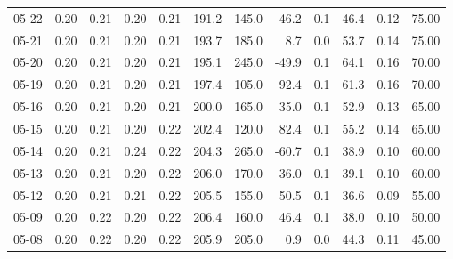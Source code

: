 \begin{threeparttable}
{\begin{tabular}{lrrrrrrrrrrr}
  05-22 &          0.20 &          0.21 &          0.20 &        0.21 &               191.2 &               145.0 &       46.2 &                 0.1 &             46.4 &            0.12 &                  75.00 \\
  05-21 &          0.20 &          0.21 &          0.20 &        0.21 &               193.7 &               185.0 &        8.7 &                 0.0 &             53.7 &            0.14 &                  75.00 \\
  05-20 &          0.20 &          0.21 &          0.20 &        0.21 &               195.1 &               245.0 &      -49.9 &                 0.1 &             64.1 &            0.16 &                  70.00 \\
  05-19 &          0.20 &          0.21 &          0.20 &        0.21 &               197.4 &               105.0 &       92.4 &                 0.1 &             61.3 &            0.16 &                  70.00 \\
  05-16 &          0.20 &          0.21 &          0.20 &        0.21 &               200.0 &               165.0 &       35.0 &                 0.1 &             52.9 &            0.13 &                  65.00 \\
  05-15 &          0.20 &          0.21 &          0.20 &        0.22 &               202.4 &               120.0 &       82.4 &                 0.1 &             55.2 &            0.14 &                  65.00 \\
  05-14 &          0.20 &          0.21 &          0.24 &        0.22 &               204.3 &               265.0 &      -60.7 &                 0.1 &             38.9 &            0.10 &                  60.00 \\
  05-13 &          0.20 &          0.21 &          0.20 &        0.22 &               206.0 &               170.0 &       36.0 &                 0.1 &             39.1 &            0.10 &                  60.00 \\
  05-12 &          0.20 &          0.21 &          0.21 &        0.22 &               205.5 &               155.0 &       50.5 &                 0.1 &             36.6 &            0.09 &                  55.00 \\
  05-09 &          0.20 &          0.22 &          0.20 &        0.22 &               206.4 &               160.0 &       46.4 &                 0.1 &             38.0 &            0.10 &                  50.00 \\
  05-08 &          0.20 &          0.22 &          0.20 &        0.22 &               205.9 &               205.0 &        0.9 &                 0.0 &             44.3 &            0.11 &                  45.00 \\

\end{tabular}}
\end{threeparttable}

